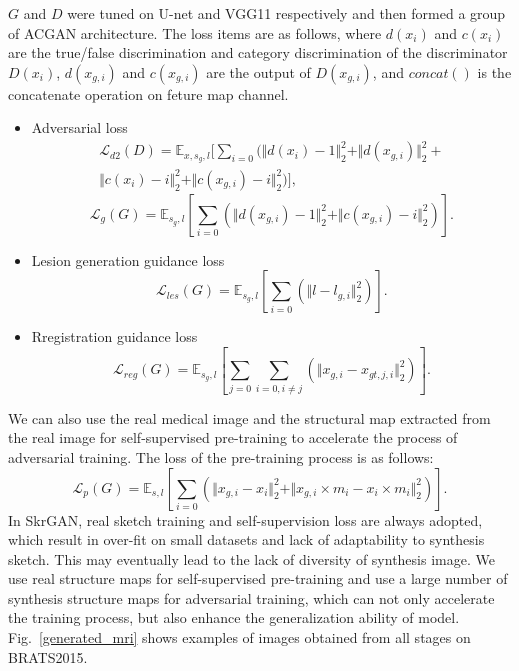 \documentclass[runningheads]{llncs}
\begin{document}
	$G$ and $D$ were tuned on U-net and VGG11 respectively and then formed a group of ACGAN\cite{98odena2016conditional} architecture. The loss items are as follows, where $d(x_{i})$ and $c(x_{i})$ are the true/false discrimination and category discrimination of the discriminator $D(x_i)$, $d(x_{g, i})$ and $c(x_{g,i})$ are the output of $D(x_{g,i})$, and $concat()$ is the concatenate operation on feture map channel. 
	\begin{itemize}
		\item{Adversarial loss}
		\begin{equation}
		\begin{split}
		\mathcal{L}_{d2}(D)=\mathbb{E}_{x,s_g,l}[\sum\limits_{i=0}(\Vert{d(x_i)-1}\Vert_{2}^{2}+\Vert{d(x_{g,i})}\Vert_{2}^{2}+\\
		\Vert{c(x_i)-i}\Vert_{2}^{2}+\Vert{c(x_{g,i})-i}\Vert_{2}^{2})],
		\end{split}
		\end{equation}
		\begin{equation}
		\mathcal{L}_{g}(G)=\mathbb{E}_{s_g,l}[\sum\limits_{i=0}(\Vert{d(x_{g,i})-1}\Vert_{2}^{2}+\Vert{c(x_{g,i})-i}\Vert_{2}^{2})].
		\end{equation}
		\item{Lesion generation guidance loss}
		\begin{equation}
		\mathcal{L}_{les}(G)=\mathbb{E}_{s_g,l}[\sum\limits_{i=0}(\Vert{l-l_{g,i}}\Vert_{2}^{2})].
		\end{equation}
		\item{Rregistration guidance loss}
		\begin{equation}
		\mathcal{L}_{reg}(G)=\mathbb{E}_{s_g,l}[\sum\limits_{j=0}\sum\limits_{i=0,i\neq j}(\Vert{x_{g,i}-x_{gt,j,i}}\Vert_{2}^{2})].
		\end{equation}
	\end{itemize}
	We can also use the real medical image and the structural map extracted from the real image for self-supervised pre-training to accelerate the process of adversarial training. The loss of the pre-training process is as follows:
	\begin{equation}
	\mathcal{L}_{p}(G)=\mathbb{E}_{s,l}[\sum\limits_{i=0}(\Vert{x_{g,i}-x_i}\Vert_{2}^{2}+\Vert{x_{g,i}\times m_i-x_{i}\times m_i}\Vert_{2}^{2})].
	\end{equation}
	In SkrGAN\cite{96zhang2019skrgan:}, real sketch training and self-supervision loss are always adopted, which result in over-fit on small datasets and lack of adaptability to synthesis sketch. This may eventually lead to the lack of diversity of synthesis image. We use real structure maps for self-supervised pre-training and use a large number of synthesis structure maps for adversarial training, which can not only accelerate the training process, but also enhance the generalization ability of model. Fig.~\ref{generated_mri} shows examples of images obtained from all stages on BRATS2015.
\end{document}
